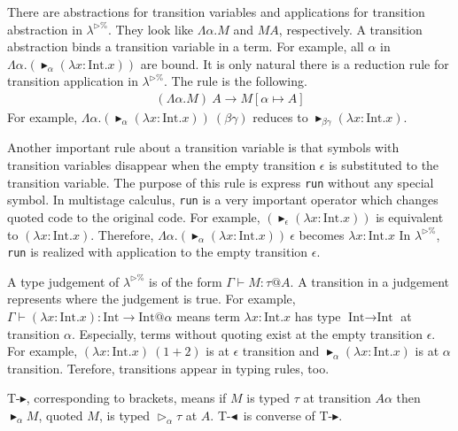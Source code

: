 \documentclass[runningheads]{llncs}
\newcommand{\LTP}{$\lambda^{\triangleright\%}$\xspace}
\newcommand{\G}{\Gamma}
\newcommand{\TW}{\triangleright}
\newcommand{\TB}{\blacktriangleright}
\newcommand{\TBL}{\blacktriangleleft}
\newcommand{\TTB}{\textsc{T-$\TB$}}
\newcommand{\TTBL}{\textsc{T-$\TBL$}}
\newcommand{\I}{\textrm{Int}}
\begin{document}

There are abstractions for transition variables and applications for transition abstraction in \LTP.
They look like $\Lambda\alpha.M$ and $M A$, respectively.
A transition abstraction binds a transition variable in a term.
For example, all $\alpha$ in $\Lambda\alpha.(\TB_\alpha (\lambda x:\I.x))$ are bound.
It is only natural there is a reduction rule for transition application in \LTP.
The rule is the following.
\begin{align*}
    (\Lambda\alpha.M)\ A \longrightarrow M[\alpha\mapsto A]
\end{align*}
For example, $\Lambda\alpha.(\TB_\alpha (\lambda x:\I.x))\ (\beta\gamma)$ reduces to $\TB_{\beta\gamma} (\lambda x:\I.x)$.


Another important rule about a transition variable is 
that symbols with transition variables disappear 
when the empty transition $\epsilon$ is substituted to the transition variable.
The purpose of this rule is express \verb|run| without any special symbol.
In multistage calculus, \verb|run| is a very important operator which changes quoted code to the original code.
For example, $(\TB_\epsilon (\lambda x:\I.x))$ is equivalent to $(\lambda x:\I.x)$.
Therefore, $\Lambda\alpha.(\TB_\alpha (\lambda x:\I.x))\ \epsilon$ becomes $\lambda x:\I.x$
In \LTP, \verb|run| is realized with application to the empty transition $\epsilon$.


A type judgement of \LTP is of the form $\G \vdash M : \tau @ A$.
A transition in a judgement represents where the judgement is true.
For example, $\G \vdash (\lambda x:\I.x) : \I \to \I @ \alpha$ means 
term $\lambda x:\I.x$ has type $\I \to \I$ at transition $\alpha$.
Especially, terms without quoting exist at the empty transition $\epsilon$.
For example, $(\lambda x:\I.x)\ (1+2)$ is at $\epsilon$ transition and 
$\TB_\alpha (\lambda x:\I.x)$ is at $\alpha$ transition.
Terefore, transitions appear in typing rules, too.
\begin{center}
    \infrule{\G\vdash M:\tau @{A\alpha}}{\G\vdash \TB_{\alpha}M:\TW_{\alpha}\tau @A}{\TTB} \andalso
    \infrule{\G\vdash M:\TW_{\alpha}\tau @A}{\G\vdash \TBL_{\alpha}M:\tau @{A\alpha}}{\TTBL}
\end{center}
\TTB, corresponding to brackets, means 
if $M$ is typed $\tau$ at transition $A\alpha$ then $\TB_{\alpha}M$, quoted $M$, is typed $\TW_{\alpha}\tau$ at $A$.
\TTBL\ is converse of \TTB.
\end{document}
